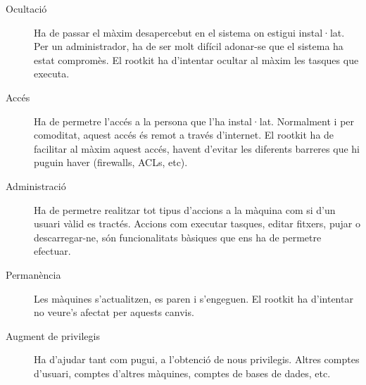 \begin{description}
    \item[Ocultació] Ha de passar el màxim desapercebut en el sistema on estigui
    instal·lat. Per un administrador, ha de ser molt difícil adonar-se que el
    sistema ha estat compromès. El rootkit ha d'intentar ocultar al màxim les tasques
    que executa.

    \item[Accés] Ha de permetre l'accés a la persona que
    l'ha instal·lat. Normalment i per comoditat, aquest accés és remot a través
    d'internet. El rootkit ha de facilitar al màxim aquest accés, havent d'evitar les diferents 
    barreres que hi puguin haver (firewalls, ACLs, etc).

    \item[Administració] Ha de permetre realitzar tot tipus
    d'accions a la màquina com si d'un usuari vàlid es tractés. Accions com executar
    tasques, editar fitxers, pujar o descarregar-ne, són funcionalitats bàsiques que ens
    ha de permetre efectuar.

    \item[Permanència] Les màquines s'actualitzen, es paren i s'engeguen. El rootkit ha
    d'intentar no veure's afectat per aquests canvis.

    \item[Augment de privilegis] Ha d'ajudar tant com pugui, a l'obtenció de nous
    privilegis. Altres comptes d'usuari, comptes d'altres màquines, comptes de bases de dades, etc.
\end{description}

